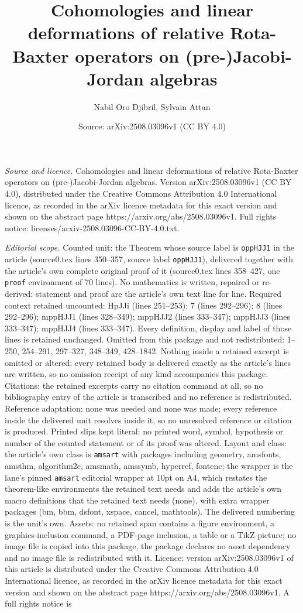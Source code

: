 \documentclass[10pt,a4paper]{amsart}
\title[Cohomologies and linear deformations of relative Rota-Baxter]{Cohomologies and linear deformations of relative Rota-Baxter operators on (pre-)Jacobi-Jordan algebras}
\author{Nabil Oro Djibril, Sylvain Attan}
\date{Source: arXiv:2508.03096v1 (CC BY 4.0)}
\begin{document}
\maketitle

\noindent\emph{Source and licence.} Cohomologies and linear deformations of relative Rota-Baxter operators on (pre-)Jacobi-Jordan algebras. Version arXiv:2508.03096v1 (CC BY 4.0), distributed under the Creative Commons Attribution 4.0 International licence, as recorded in the arXiv licence metadata for this exact version and shown on the abstract page https://arxiv.org/abs/2508.03096v1. Full rights notice: licenses/arxiv-2508.03096-CC-BY-4.0.txt.\par\smallskip

\noindent\textit{Editorial scope.} Counted unit: the Theorem whose source label is \texttt{oppHJJ1} in the article (source0.tex lines 350--357, source label \texttt{oppHJJ1}), delivered together with the article's own complete original proof of it (source0.tex lines 358--427, one \texttt{proof} environment of 70 lines). No mathematics is written, repaired or re-derived: statement and proof are the article's own text line for line. Required context retained uncounted: HpJJi (lines 251--253); 7 (lines 292--296); 8 (lines 292--296); mppHJJ1 (lines 328--349); mppHJJ2 (lines 333--347); mppHJJ3 (lines 333--347); mppHJJ4 (lines 333--347). Every definition, display and label of those lines is retained unchanged. Omitted from this package and not redistributed: 1--250, 254--291, 297--327, 348--349, 428--1842. Nothing inside a retained excerpt is omitted or altered: every retained body is delivered exactly as the article's lines are written, so no omission receipt of any kind accompanies this package. Citations: the retained excerpts carry no citation command at all, so no bibliography entry of the article is transcribed and no reference is redistributed. Reference adaptation: none was needed and none was made; every reference inside the delivered unit resolves inside it, so no unresolved reference or citation is produced. Printed slips kept literal: no printed word, symbol, hypothesis or number of the counted statement or of its proof was altered. Layout and class: the article's own class is \texttt{amsart} with packages including geometry, amsfonts, amsthm, algorithm2e, amsmath, amssymb, hyperref, fontenc; the wrapper is the lane's pinned \texttt{amsart} editorial wrapper at 10pt on A4, which restates the theorem-like environments the retained text needs and adds the article's own macro definitions that the retained text needs (none), with extra wrapper packages (bm, bbm, dsfont, xspace, cancel, mathtools). The delivered numbering is the unit's own. Assets: no retained span contains a figure environment, a graphics-inclusion command, a PDF-page inclusion, a table or a TikZ picture; no image file is copied into this package, the package declares no asset dependency and no image file is redistributed with it. Licence: version arXiv:2508.03096v1 of this article is distributed under the Creative Commons Attribution 4.0 International licence, as recorded in the arXiv licence metadata for this exact version and shown on the abstract page https://arxiv.org/abs/2508.03096v1. A full rights notice is 
\end{document}

